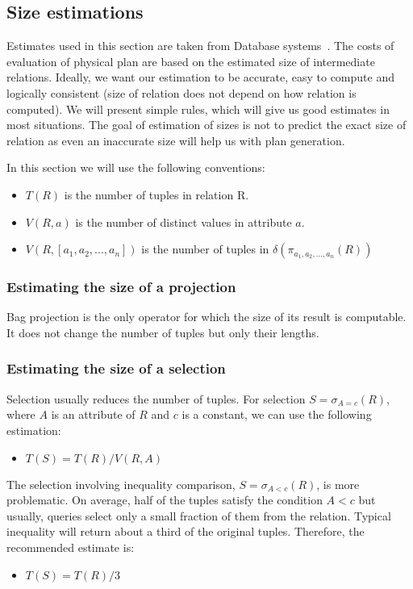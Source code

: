 \subsection{Size estimations}
Estimates used in this section are taken from Database systems~\cite{database}. 
The costs of evaluation of physical plan are based on the estimated size of interme\-dia\-te relations. Ideally, we want our estimation to be accurate, easy to compute and logically consistent (size of relation does not depend on how relation is computed). We will present simple rules, which will give us good estimates in most situations. The goal of estimation of sizes is not to predict the exact size of relation as even an inaccurate size will help us with plan generation.

In this section we will use the following conventions:

\begin{itemize}
\item $T(R)$ is the number of tuples in relation R.
\item $V(R,a)$ is the number of distinct values in attribute $a$. 
\item $V(R,[a_1,a_2,...,a_n])$ is the number of tuples in $\delta(\pi_{a_1,a_2,...,a_n}(R))$
\end{itemize}

\subsubsection{Estimating the size of a projection}

Bag projection is the only operator for which the size of its result is computable. It does not change the number of tuples but only their lengths.

\subsubsection{Estimating the size of a selection}

Selection usually reduces the number of tuples. For selection $S=\sigma_{A=c}(R)$, where $A$ is an attribute of $R$ and $c$ is a constant, we can use the following estimation:
\begin{itemize}
\item $T(S)=T(R)/V(R,A)$
\end{itemize}

The selection involving inequality comparison, $S=\sigma_{A<c}(R)$, is more problematic. On average, half of the tuples satisfy the condition $A<c$ but usually, queries select only a small fraction of them from the relation. Typical inequality will return about a third of the original tuples. Therefore, the recommended estimate is:
\begin{itemize}
\item $T(S)=T(R)/3$
\end{itemize}

